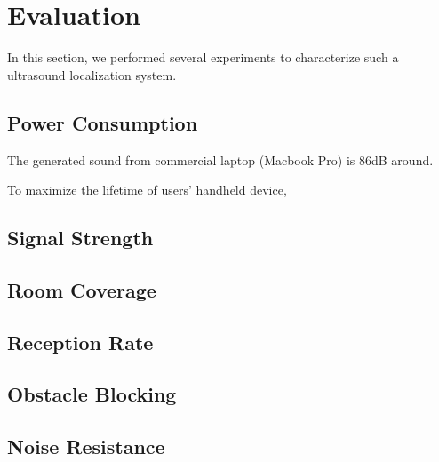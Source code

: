 \section{Evaluation}
\label{sec:evaluation}

In this section, we performed several experiments to characterize such a ultrasound localization system.

\subsection{Power Consumption}
\label{sec:power-consumption}

The generated sound from commercial laptop (Macbook Pro) is 86dB around.

To maximize the lifetime of users' handheld device, 

\subsection{Signal Strength}
\label{sec:signal-strength}

\subsection{Room Coverage}
\label{sec:room-coverage}

\subsection{Reception Rate}
\label{sec:reception-rate}

\subsection{Obstacle Blocking}
\label{sec:obstacle-blocking}

\subsection{Noise Resistance}
\label{sec:noise-resistance}



